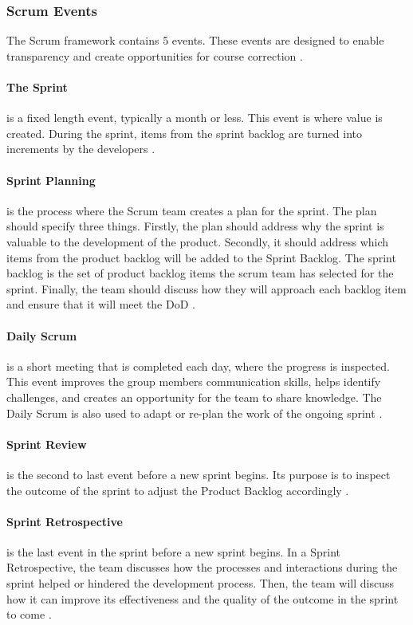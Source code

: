 \subsubsection{Scrum Events}
The Scrum framework contains 5 events. 
These events are designed to enable transparency and create opportunities for course correction  \cite{schwaber_sutherland_2022}.

\paragraph{The Sprint}
is a fixed length event, typically a month or less.
This event is where value is created. 
During the sprint, items from the sprint backlog are turned into increments by the developers \cite{schwaber_sutherland_2022}.

\paragraph{Sprint Planning}
is the process where the Scrum team creates a plan for the sprint. 
The plan should specify three things. 
Firstly, the plan should address why the sprint is valuable to the development of the product. 
Secondly, it should address which items from the product backlog will be added to the Sprint Backlog. 
The sprint backlog is the set of product backlog items the scrum team has selected for the sprint. 
Finally, the team should discuss how they will approach each backlog item and ensure that it will meet the DoD \cite{schwaber_sutherland_2022}.


\paragraph{Daily Scrum}
is a short meeting that is completed each day, where the progress is inspected.
This event improves the group members communication skills, helps identify challenges, and creates an opportunity for the team to share knowledge.
The Daily Scrum is also used to adapt or re-plan the work of the ongoing sprint \cite{schwaber_sutherland_2022}.

\paragraph{Sprint Review}
is the second to last event before a new sprint begins.
Its purpose is to inspect the outcome of the sprint to adjust the Product Backlog accordingly \cite{schwaber_sutherland_2022}.

\paragraph{Sprint Retrospective}
is the last event in the sprint before a new sprint begins. 
In a Sprint Retrospective, the team discusses how the processes and interactions during the sprint helped or hindered the development process. 
Then, the team will discuss how it can improve its effectiveness and the quality of the outcome in the sprint to come \cite{schwaber_sutherland_2022}.
